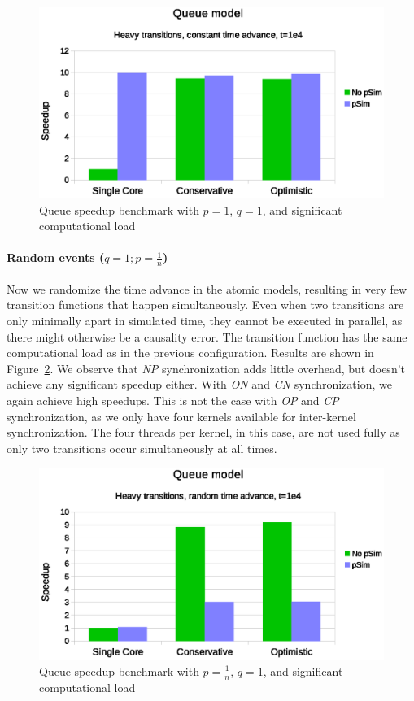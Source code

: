 \begin{figure}
	\center
	\includegraphics[width=\columnwidth]{fig/pdevs_fixed_sleep.eps}
	\caption{Queue speedup benchmark with $p = 1$, $q = 1$, and significant computational load}
	\label{fig:psim_plot_fixed_sleep}
\end{figure}

\paragraph{Random events ($q = 1; p = \frac{1}{n}$)}
Now we randomize the time advance in the atomic models, resulting in very few transition functions that happen simultaneously.
Even when two transitions are only minimally apart in simulated time, they cannot be executed in parallel, as there might otherwise be a causality error.
The transition function has the same computational load as in the previous configuration. 
Results are shown in Figure~\ref{fig:psim_plot_random_sleep}.
We observe that \textit{NP} synchronization adds little overhead, but doesn't achieve any significant speedup either.
With \textit{ON} and \textit{CN} synchronization, we again achieve high speedups.
This is not the case with \textit{OP} and \textit{CP} synchronization, as we only have four kernels available for inter-kernel synchronization.
The four threads per kernel, in this case, are not used fully as only two transitions occur simultaneously at all times.

\begin{figure}
	\center
	\includegraphics[width=\columnwidth]{fig/pdevs_random_sleep.eps}
	\caption{Queue speedup benchmark with $p = \frac{1}{n}$, $q = 1$, and significant computational load}
	\label{fig:psim_plot_random_sleep}
\end{figure}

